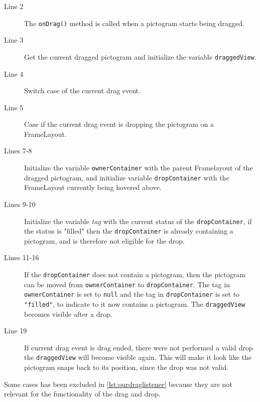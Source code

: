 \begin{description}
\item[Line 2] The \lstinline|onDrag()| method is called when a pictogram starts being dragged.
\item[Line 3] Get the current dragged pictogram and initialize the variable \lstinline|draggedView|.
\item[Line 4] Switch case of the current drag event.
\item[Line 5] Case if the current drag event is dropping the pictogram on a FrameLayout.
\item[Lines 7-8] Initialize the variable \lstinline|ownerContainer| with the parent Framelayout of the dragged pictogram, and initialize variable \lstinline|dropContainer| with the FrameLayout currently being hovered above.  
\item[Lines 9-10] Initialize the variable \textit{tag} with the current status of the \lstinline|dropContainer|, if the status is "filled" then the \lstinline|dropContainer| is already containing a pictogram, and is therefore not eligible for the drop.
\item[Lines 11-16] If the \lstinline|dropContainer| does not contain a pictogram, then the pictogram can be moved from \lstinline|ownerContainer| to \lstinline|dropContainer|. The tag in \lstinline|ownerContainer| is set to \lstinline|null| and the tag in \lstinline|dropContainer| is set to \lstinline|"filled"|, to indicate to it now contains a pictogram. The \lstinline|draggedView| becomes visible after a drop.
\item[Line 19] If current drag event is drag ended,  there were not performed a valid drop the \lstinline|draggedView| will become visible again. This will make it look like the pictogram snaps back to its position, since the drop was not valid.
\end{description}
Some cases has been excluded in \autoref{lst:ourdraglistener} because they are not relevant for the functionality of the drag and drop.
